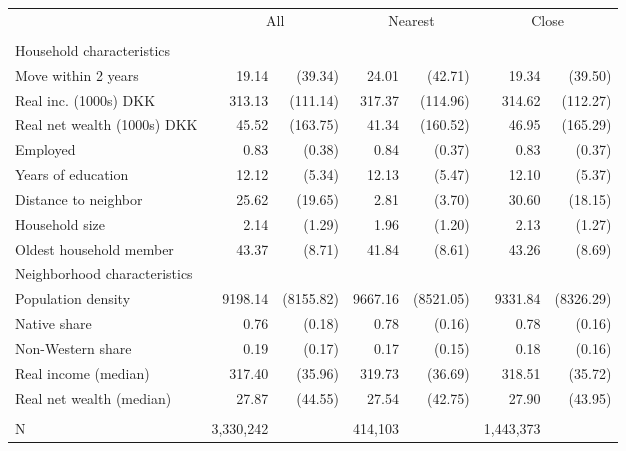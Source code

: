 \begin{tabular}{lrrrrrr}
\toprule
 & \multicolumn{2}{c}{All} & \multicolumn{2}{c}{Nearest} & \multicolumn{2}{c}{Close} \\ 
\cmidrule(lr){2-3} \cmidrule(lr){4-5} \cmidrule(lr){6-7}
 &  &  &  &  &  &  \\ 
\midrule
\multicolumn{7}{l}{Household characteristics} \\ 
\midrule
Move within 2 years & 19.14 & (39.34) & 24.01 & (42.71) & 19.34 & (39.50) \\ 
Real inc. (1000s) DKK & 313.13 & (111.14) & 317.37 & (114.96) & 314.62 & (112.27) \\ 
Real net wealth (1000s) DKK & 45.52 & (163.75) & 41.34 & (160.52) & 46.95 & (165.29) \\ 
Employed & 0.83 & (0.38) & 0.84 & (0.37) & 0.83 & (0.37) \\ 
Years of education & 12.12 & (5.34) & 12.13 & (5.47) & 12.10 & (5.37) \\ 
Distance to neighbor & 25.62 & (19.65) & 2.81 & (3.70) & 30.60 & (18.15) \\ 
Household size & 2.14 & (1.29) & 1.96 & (1.20) & 2.13 & (1.27) \\ 
Oldest household member & 43.37 & (8.71) & 41.84 & (8.61) & 43.26 & (8.69) \\ 
\midrule
\multicolumn{7}{l}{Neighborhood characteristics} \\ 
\midrule
Population density & 9198.14 & (8155.82) & 9667.16 & (8521.05) & 9331.84 & (8326.29) \\ 
Native share & 0.76 & (0.18) & 0.78 & (0.16) & 0.78 & (0.16) \\ 
Non-Western share & 0.19 & (0.17) & 0.17 & (0.15) & 0.18 & (0.16) \\ 
Real income (median) & 317.40 & (35.96) & 319.73 & (36.69) & 318.51 & (35.72) \\ 
Real net wealth (median) & 27.87 & (44.55) & 27.54 & (42.75) & 27.90 & (43.95) \\ 
\midrule
\multicolumn{7}{l}{\vspace*{-5mm}} \\ 
N & 3,330,242 &  & 414,103 &  & 1,443,373 &  \\ 
\bottomrule
\end{tabular}
